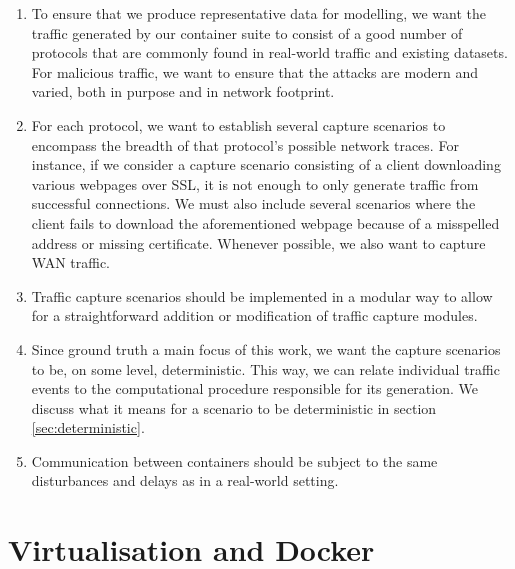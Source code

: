 \documentclass[sigconf,anonymous]{acmart}\usepackage[]{graphicx}\usepackage[]{color}
\begin{document}
\begin{enumerate}

\item To ensure that we produce representative data for modelling, we want the traffic generated by our container suite to consist of a good number of protocols that are commonly found in real-world traffic and existing datasets. For malicious traffic, we want to ensure that the attacks are modern and varied, both in purpose and in network footprint.

\item For each protocol, we want to establish several capture scenarios  to encompass the breadth of that protocol's possible network traces. For instance, if we consider a capture scenario consisting of a client downloading various webpages over SSL, it is not enough to only generate traffic from successful connections. We must also include several scenarios where the client fails to download the aforementioned webpage because of a misspelled address or missing certificate. Whenever possible, we also want to capture WAN traffic.
  
\item Traffic capture scenarios should be implemented in a modular way to allow for a straightforward addition or modification of traffic capture modules. 
 
\item Since ground truth a main focus of this work, we want the capture scenarios to be, on some level, deterministic. This way, we can relate individual traffic events to the computational procedure responsible for its generation.
We discuss what it means for a scenario to be deterministic in section \ref{sec:deterministic}. 

  
\item Communication between containers should be subject to the same disturbances and delays as in a real-world setting.

\end{enumerate}

\section{Virtualisation and Docker}
\end{document}
